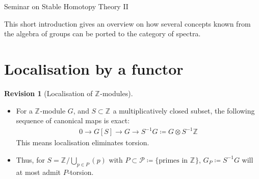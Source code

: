 \documentclass[english]{scrartcl}
\theoremstyle{definition}
\newtheorem*{Rev}{Revision}
\theoremstyle{remark}
\newcommand*{\Z}[1][]{\mathds{Z}_{#1}}  %
\newcommand*{\longto}{\longrightarrow}
\newcommand*{\Ps}{P}  %
\newcommand*{\PS}{\mathcal{P}} %
\begin{document}
\clearpairofpagestyles
{}
\cfoot*{\pagemark}

\begin{center}
  Seminar on Stable Homotopy Theory II\par
\end{center}
\smallskip

This short introduction gives an overview on how several concepts
known from the algebra of groups can be ported to the category of
spectra.

\section{Localisation by a functor}
\begin{Rev}[Localisation of $\Z$-modules]
  \begin{itemize}
  \item For a $\Z$-module $G$, and $S\subset\Z$ a multiplicatively
    closed subset, the following sequence of canonical maps is exact:
    \begin{gather*}
      0 \longto G[S] \longto G \longto S^{-1}G\coloneqq G\otimes
      S^{-1}\Z
    \end{gather*}
    This means localisation eliminates torsion.
  \item Thus, for $S=\Z/\bigcup_{p\in\Ps}(p)$ with
    $\Ps\subset\PS\coloneqq\{\text{primes in $\Z$}\}$,
    $G_P\coloneqq S^{-1}G$ will at most admit $P$-torsion.
  \end{itemize}
\end{Rev}
\end{document}
